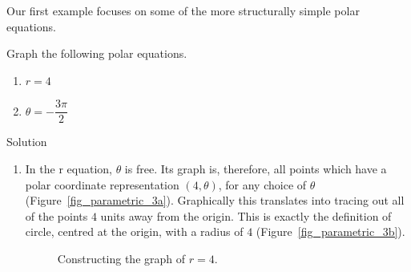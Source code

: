 Our first example focuses on some of the more structurally simple polar equations.

\begin{example} \label{rthetaconstant} Graph the following polar equations.

\begin{multicols}{2}
\begin{enumerate}

\item  $r = 4$

\item  $\theta = -\dfrac{3\pi}{2}$

\end{enumerate}
\end{multicols}
Solution 

\begin{enumerate}

\item  In the r equation, $\theta$ is free.  Its graph is, therefore,  all points which have a polar coordinate representation $(4,\theta)$, for any choice of $\theta$ (Figure~\ref{fig_parametric_3a}).  Graphically this translates into tracing out all of the points $4$ units away from the origin.  This is exactly the definition of circle, centred at the origin, with a radius of $4$ (Figure~\ref{fig_parametric_3b}).



\begin{figure}[H]
\centering
\centerline{
\hspace{0.1cm}
}
\caption{Constructing the graph of $r=4$.}
\end{figure}



\end{enumerate}
\end{example}
